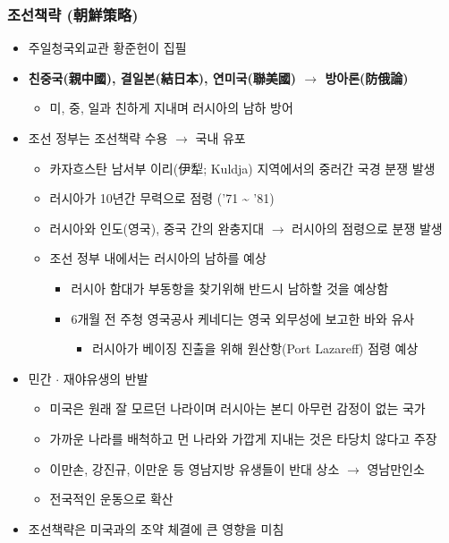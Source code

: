 \subsubsection*{조선책략 (朝鮮策略)}
\begin{itemize}
    \item 주일청국외교관 황준헌이 집필
    \item \textbf{친중국(親中國), 결일본(結日本), 연미국(聯美國) $\rightarrow$ 방아론(防俄論)}
    \begin{itemize}
        \item 미, 중, 일과 친하게 지내며 러시아의 남하 방어
    \end{itemize}
    \item 조선 정부는 조선책략 수용 $\rightarrow$ 국내 유포
    \begin{itemize}
        \item 카자흐스탄 남서부 이리(伊犁; Kuldja) 지역에서의 중러간 국경 분쟁 발생
        \item 러시아가 10년간 무력으로 점령 ('71 \textasciitilde{} '81)
        \item 러시아와 인도(영국), 중국 간의 완충지대 $\rightarrow$ 러시아의 점령으로 분쟁 발생
        \item 조선 정부 내에서는 러시아의 남하를 예상
        \begin{itemize}
            \item 러시아 함대가 부동항을 찾기위해 반드시 남하할 것을 예상함
            \item 6개월 전 주청 영국공사 케네디는 영국 외무성에 보고한 바와 유사
            \begin{itemize}
                \item 러시아가 베이징 진출을 위해 원산항(Port Lazareff) 점령 예상
            \end{itemize}
        \end{itemize}
    \end{itemize}
    \item 민간 $\cdot$ 재야유생의 반발
    \begin{itemize}
        \item 미국은 원래 잘 모르던 나라이며 러시아는 본디 아무런 감정이 없는 국가
        \item 가까운 나라를 배척하고 먼 나라와 가깝게 지내는 것은 타당치 않다고 주장
        \item 이만손, 강진규, 이만운 등 영남지방 유생들이 반대 상소 $\rightarrow$ 영남만인소
        \item 전국적인 운동으로 확산
    \end{itemize}
    \item 조선책략은 미국과의 조약 체결에 큰 영향을 미침
\end{itemize}

